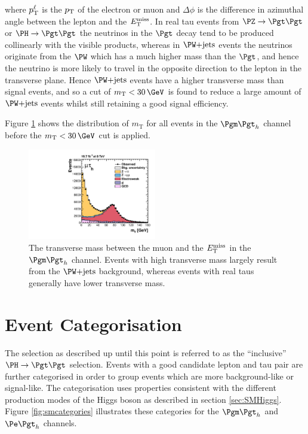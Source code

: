 where $p_{\mathrm{T}}^{\ell}$ is the $p_{\mathrm{T}}$ of the electron or muon and $\Delta\phi$ is the
difference in azimuthal angle between the lepton and the $\MET$. In real tau
events from $\PZ\to\Pgt\Pgt$ or $\PH\to\Pgt\Pgt$ the neutrinos in the $\Pgt$
decay tend to be produced collinearly with the visible products, whereas in
$\WJets$ events the neutrinos originate from the $\PW$ which has a much higher
mass than the $\Pgt$, and hence the neutrino is more likely to travel in the
opposite direction to the lepton in the transverse plane. Hence $\WJets$ events
have a higher transverse mass than signal events, and so a cut of
$m_{\text{T}}<30\,\GeV$ is found to reduce a large amount of $\WJets$ events
whilst still retaining a good signal efficiency. 

Figure \ref{fig:transversemass} shows the distribution of $m_{\text{T}}$ for all
events in the $\mutau$ channel before the $m_{\text{T}}<30\,\GeV$ cut is
applied.

\begin{figure}[htb]
\begin{center}
    \includegraphics[width=0.5\textwidth]
      {plots/htt-sm/mt_1_inclusive_mt_2012.pdf}

\end{center}
\caption[The transverse mass between the muon and the $\MET$ in the $\mutau$ channel.]{
 The transverse mass between the muon and the $\MET$ in the $\mutau$ channel.
 Events with high transverse mass largely result from the $\WJets$ background,
 whereas events with real taus generally have lower transverse mass.
}
\label{fig:transversemass}
\end{figure}


\section{Event Categorisation}
\label{sec:eventcategorisation}

The selection as described up until this point is referred to as the
``inclusive'' $\HToTauTau$ selection. 
Events with a good candidate lepton and tau pair are further categorised in
order to group events which are more background-like or signal-like. The
categorisation uses properties consistent with the different production modes of
the Higgs boson as described in section \ref{sec:SMHiggs}. Figure
\ref{fig:smcategories} illustrates these categories for the $\mutau$ and $\etau$
channels.

